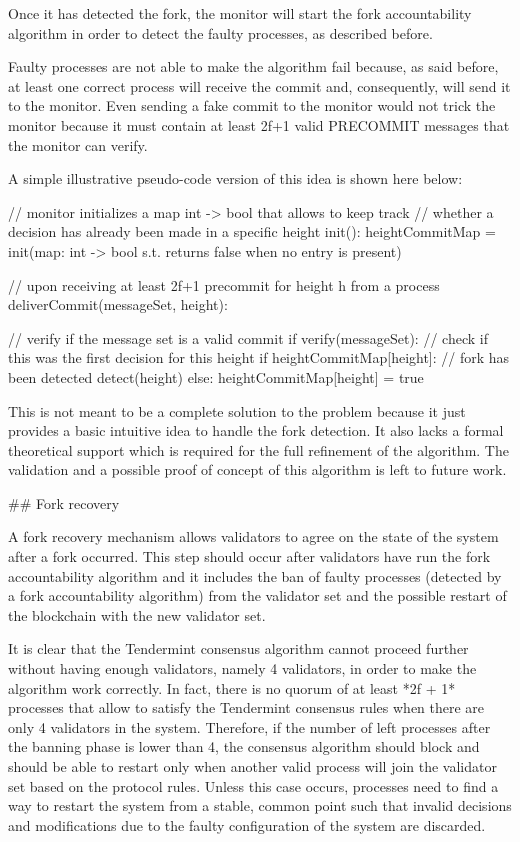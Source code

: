 \documentclass[a4paper,11pt,oneside]{report}
\begin{document}
\begin{markdown}
Once it has detected the fork, the monitor will start the fork accountability algorithm in order to detect the faulty processes, as described before.

Faulty processes are not able to make the algorithm fail because, as said before, at least one correct process will receive the commit and, consequently, will send it to the monitor. Even sending a fake commit to the monitor would not trick the monitor because it must contain at least 2f+1 valid PRECOMMIT messages that the monitor can verify.

A simple illustrative pseudo-code version of this idea is shown here below:


    // monitor initializes a map int -> bool that allows to keep track
    // whether a decision has already been made in a specific height
    init():
	    heightCommitMap = init(map: int -> bool s.t. returns false when no entry is present)

    // upon receiving at least 2f+1 precommit for height h from a process 
    deliverCommit(messageSet, height):
   
        // verify if the message set is a valid commit
	    if verify(messageSet):
		    // check if this was the first decision for this height
		    if heightCommitMap[height]:
			    // fork has been detected
			    detect(height)
		    else:
			    heightCommitMap[height] = true

This is not meant to be a complete solution to the problem because it just provides a basic intuitive idea to handle the fork detection. It also lacks a formal theoretical support which is required for the full refinement of the algorithm.
The validation and a possible proof of concept of this algorithm is left to future work.

## Fork recovery

A fork recovery mechanism allows validators to agree on the state of the system after a fork occurred. 
This step should occur after validators have run the fork accountability algorithm and it includes the ban of faulty processes (detected by a fork accountability algorithm) from the validator set and the possible restart of the blockchain with the new validator set.

It is clear that the Tendermint consensus algorithm cannot proceed further without having enough validators, namely 4 validators, in order to make the algorithm work correctly. In fact, there is no quorum of at least *2f + 1* processes that allow to satisfy the Tendermint consensus rules when there are only 4 validators in the system. 
Therefore, if the number of left processes after the banning phase is lower than 4, the consensus algorithm should block and should be able to restart only when another valid process will join the validator set based on the protocol rules.
Unless this case occurs, processes need to find a way to restart the system from a stable, common point such that invalid decisions and modifications due to the faulty configuration of the system are discarded.


\end{markdown}
\end{document}
